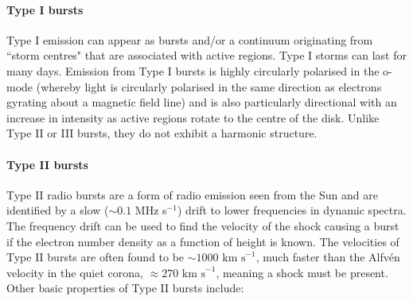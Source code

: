 \paragraph{Type I bursts}
Type I emission can appear as bursts and/or a continuum originating from ``storm centres" that are associated with active regions. Type I storms can last for many days. Emission from Type I bursts is highly circularly polarised in the o-mode (whereby light is circularly polarised in the same direction as electrons gyrating about a magnetic field line) and is also particularly directional with an increase in intensity as active regions rotate to the centre of the disk. Unlike Type II or III bursts, they do not exhibit a harmonic structure.
\paragraph{Type II bursts}
Type II radio bursts are a form of radio emission seen from the Sun and are identified by a slow ($\sim 0.1$ MHz s$^{-1}$) drift to lower frequencies in dynamic spectra. The frequency drift can be used to find the velocity of the shock causing a burst if the electron number density as a function of height is known. The velocities of Type II bursts are often found to be $\sim 1000 \mbox{ km s}^{-1}$, much faster than the Alfv\'{e}n velocity in the quiet corona, $\approx 270 \mbox{ km s}^{-1}$, meaning a shock must be present. Other basic properties of Type II bursts include:
